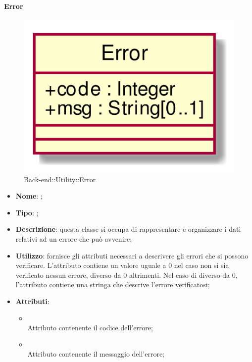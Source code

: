 \hypertarget{Error_label}{\paragraph{Error}}
\begin{figure}[h]
	\centering
	\includegraphics[width=\textwidth,height=\textheight,keepaspectratio]{images/ClassError.png}
	\caption{Back-end::Utility::Error}
\end{figure}
\begin{itemize}
	\item \textbf{Nome}: ;
	\item \textbf{Tipo}: ;
	\item \textbf{Descrizione}: questa classe si occupa di rappresentare e organizzare i dati relativi ad un errore che può avvenire;
	\item \textbf{Utilizzo}: fornisce gli attributi necessari a descrivere gli errori che si possono verificare.
L'attributo  contiene un valore uguale a 0 nel caso non si sia verificato nessun errore, diverso da 0 altrimenti.
Nel caso di  diverso da 0, l'attributo  contiene una stringa che descrive l'errore verificatosi;
	\item \textbf{Attributi}:
	\begin{itemize}
		\item[]  \\
		Attributo contenente il codice dell'errore;
		\item[]  \\
		Attributo contenente il messaggio dell'errore;
	\end{itemize}
\end{itemize}

